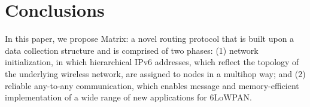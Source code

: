 \section{Conclusions}\label{sec:conclusion}

In this paper, we propose Matrix: a novel routing protocol that is
built upon a data collection structure and is comprised of two
phases: (1) network initialization, in which hierarchical IPv6
addresses, which reflect the topology of the underlying wireless
network, are assigned to nodes in a multihop way; and (2) reliable
any-to-any communication, which enables message and memory-efficient
implementation of a wide range of new applications for 6LoWPAN.
